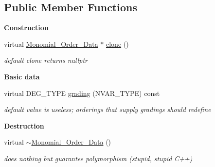 \subsection*{Public Member Functions}
\begin{Indent}\textbf{ Construction}\par
\begin{DoxyCompactItemize}
\item 
\mbox{\label{class_monomial___order___data_a636a75b3d5e776f9ed09668a3b9673c6}} 
virtual \hyperlink{class_monomial___order___data}{Monomial\+\_\+\+Order\+\_\+\+Data} $\ast$ \hyperlink{class_monomial___order___data_a636a75b3d5e776f9ed09668a3b9673c6}{clone} ()
\begin{DoxyCompactList}\small\item\em default clone returns {\ttfamily nullptr} \end{DoxyCompactList}\end{DoxyCompactItemize}
\end{Indent}
\begin{Indent}\textbf{ Basic data}\par
\begin{DoxyCompactItemize}
\item 
\mbox{\label{class_monomial___order___data_a581ab0398e12b7c0ad80212ad50e86b8}} 
virtual D\+E\+G\+\_\+\+T\+Y\+PE \hyperlink{class_monomial___order___data_a581ab0398e12b7c0ad80212ad50e86b8}{grading} (N\+V\+A\+R\+\_\+\+T\+Y\+PE) const
\begin{DoxyCompactList}\small\item\em default value is useless; orderings that supply gradings should redefine \end{DoxyCompactList}\end{DoxyCompactItemize}
\end{Indent}
\begin{Indent}\textbf{ Destruction}\par
\begin{DoxyCompactItemize}
\item 
\mbox{\label{class_monomial___order___data_a278b8c06b208d8549ba2f871f93239be}} 
virtual \hyperlink{class_monomial___order___data_a278b8c06b208d8549ba2f871f93239be}{$\sim$\+Monomial\+\_\+\+Order\+\_\+\+Data} ()
\begin{DoxyCompactList}\small\item\em does nothing but guarantee polymorphism (stupid, stupid C++) \end{DoxyCompactList}\end{DoxyCompactItemize}
\end{Indent}


